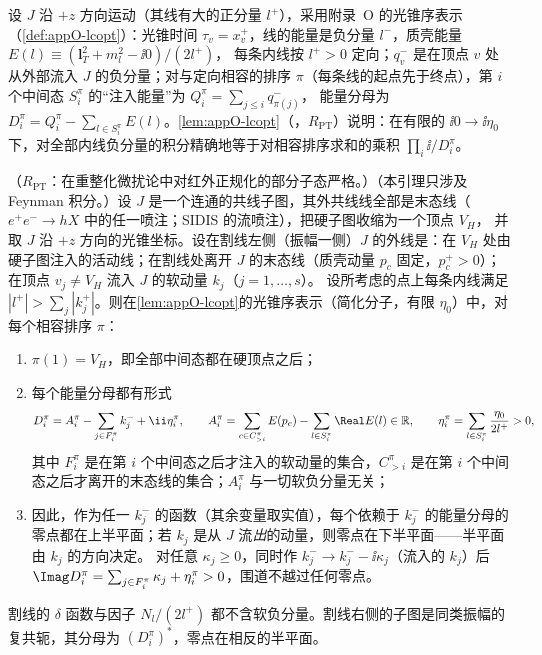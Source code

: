 设 $J$ 沿 $+z$ 方向运动（其线有大的正分量 $l^+$），采用附录~O 的光锥序表示（\cref{def:appO-lcopt}）：光锥时间 $\tau_v=x_v^+$，线的能量是负分量 $l^-$，质壳能量 $E(l)\equiv(\mathbf l_T^2+m_l^2-\ii0)/(2l^+)$，
每条内线按 $l^+>0$ 定向；$q_v^-$ 是在顶点 $v$ 处从外部流入 $J$ 的负分量；对与定向相容的排序 $\pi$（每条线的起点先于终点），第 $i$ 个中间态 $S_i^\pi$ 的“注入能量”为 $Q_i^\pi=\sum_{j\le i}q^-_{\pi(j)}$，
能量分母为 $D_i^\pi=Q_i^\pi-\sum_{l\in S_i^\pi}E(l)$。\cref{lem:appO-lcopt}（\tagR，$R_{\mathrm{PT}}$）说明：在有限的 $\ii0\to\ii\eta_0$ 下，对全部内线负分量的积分精确地等于对相容排序求和的乘积 $\prod_i\ii/D_i^\pi$。

\begin{lemma}\label{lem:coll-final-poles}
（$R_{\mathrm{PT}}$：在重整化微扰论中对红外正规化的部分子态严格。）（本引理只涉及 Feynman 积分。）设 $J$ 是一个连通的共线子图，其外共线线全部是末态线（$e^+e^-\to hX$ 中的任一喷注；SIDIS 的流喷注），把硬子图收缩为一个顶点 $V_H$，
并取 $J$ 沿 $+z$ 方向的光锥坐标。设在割线左侧（振幅一侧）$J$ 的外线是：在 $V_H$ 处由硬子图注入的活动线；在割线处离开 $J$ 的末态线（质壳动量 $p_c$ 固定，$p_c^+>0$）；在顶点 $v_j\ne V_H$ 流入 $J$ 的软动量 $k_j$（$j=1,\dots,s$）。
设所考虑的点上每条内线满足 $|l^+|>\sum_j|k_j^+|$。则在\cref{lem:appO-lcopt}的光锥序表示（简化分子，有限 $\eta_0$）中，对每个相容排序 $\pi$：
\begin{enumerate}[label=(\alph*),leftmargin=2em,itemsep=1pt,topsep=2pt]
\item $\pi(1)=V_H$，即全部中间态都在硬顶点之后；
\item 每个能量分母都有形式
\begin{equation}\label{eq:coll-Dfinal}
D_i^\pi=A_i^\pi-\sum_{j\in F_i^\pi}k_j^-+\ii\eta_i^\pi,\qquad A_i^\pi=\sum_{c\in C_{>i}^\pi}E(p_c)-\sum_{l\in S_i^\pi}\Real E(l)\in\mathbb R,\qquad \eta_i^\pi=\sum_{l\in S_i^\pi}\frac{\eta_0}{2l^+}>0,
\end{equation}
其中 $F_i^\pi$ 是在第 $i$ 个中间态之后才注入的软动量的集合，$C_{>i}^\pi$ 是在第 $i$ 个中间态之后才离开的末态线的集合；$A_i^\pi$ 与一切软负分量无关；
\item 因此，作为任一 $k_j^-$ 的函数（其余变量取实值），每个依赖于 $k_j^-$ 的能量分母的零点都在上半平面；若 $k_j$ 是从 $J$ 流\emph{出}的动量，则零点在下半平面——半平面由 $k_j$ 的方向决定。
对任意 $\kappa_j\ge0$，同时作 $k_j^-\to k_j^--\ii\kappa_j$（流入的 $k_j$）后 $\Imag D_i^\pi=\sum_{j\in F_i^\pi}\kappa_j+\eta_i^\pi>0$，围道不越过任何零点。
\end{enumerate}
割线的 $\delta$ 函数与因子 $N_l/(2l^+)$ 都不含软负分量。割线右侧的子图是同类振幅的复共轭，其分母为 $(D_i^\pi)^*$，零点在相反的半平面。
\end{lemma}

